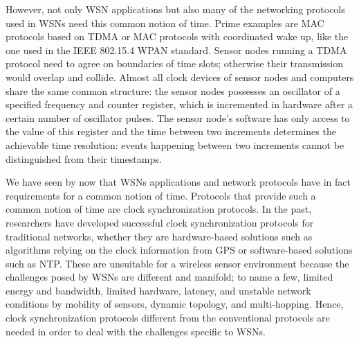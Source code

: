 However, not only WSN applications but also many of the networking protocols used in WSNs need this common notion of time. Prime examples are MAC protocols based on \ac{TDMA} or \ac{MAC} protocols with coordinated wake up, like the one used in the IEEE 802.15.4 \ac{WPAN} standard. Sensor nodes running a TDMA protocol need to agree on boundaries of time slots; otherwise their transmission would overlap and collide. Almost all clock devices of sensor nodes and computers share the same common structure: the sensor nodes possesses an oscillator of a specified frequency and counter register, which is incremented in hardware after a certain number of oscillator pulses. The sensor node's software has only access to the value of this register and the time between two increments determines the achievable time  resolution: events happening between two increments cannot be distinguished from their timestamps.

We have seen by now that WSNs applications and network protocols have in fact requirements for a common notion of time. Protocols that provide such a common notion of time are clock synchronization protocols. In the past, researchers have developed successful clock synchronization protocols for traditional networks, whether they are hardware-based solutions such as algorithms relying on the clock information from \ac{GPS} or software-based solutions such as \ac{NTP}. These are unsuitable for a wireless sensor environment because the challenges posed by WSNs are different and manifold; to name a few, limited energy and bandwidth, limited hardware, latency, and unstable network conditions by mobility of sensors, dynamic topology, and multi-hopping. Hence, clock synchronization protocols different from the conventional protocols are needed in order to deal with the challenges specific to WSNs.

